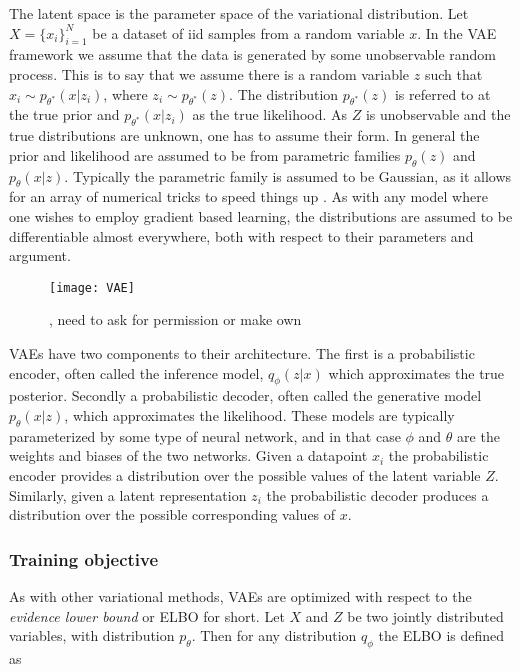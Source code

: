 \documentclass[../../thesis.tex]{subfiles}
\begin{document}
The latent space is the parameter space of the variational distribution.\newline
Let $X = \{x_i\}_{i=1}^{N}$ be a dataset of iid samples from a random variable $x$. In the VAE framework we assume that the data is generated by some unobservable random process. This is to say that we assume there is a random variable $z$ such that $x_i \sim p_{\theta^*}(x|z_i)$, where $z_i \sim p_{\theta^*}(z)$. The distribution $p_{\theta^*}(z)$ is referred to at the true prior and $p_{\theta^*}(x|z_i)$ as the true likelihood. 
As $Z$ is unobservable and the true distributions are unknown, one has to assume their form. In general the prior and likelihood are assumed to be from parametric families $p_{\theta}(z)$ and $p_{\theta}(x|z)$. Typically the parametric family is assumed to be Gaussian, as it allows for an array of numerical tricks to speed things up . As with any model where one wishes to employ gradient based learning, the distributions are assumed to be differentiable almost everywhere, both with respect to their parameters and argument.\newline
\begin{figure}[h]
    \texttt{[image: VAE]}
    \centering  
    \caption{\cite{VAE}, need to ask for permission or make own}  
\end{figure}

VAEs have two components to their architecture. The first is a probabilistic encoder, often called the inference model, $q_\phi(z|x)$ which approximates the true posterior. Secondly a probabilistic decoder, often called the generative model $p_\theta(x|z)$, which approximates the likelihood. These models are typically parameterized by some type of neural network, and in that case $\phi$ and $\theta$ are the weights and biases of the two networks. Given a datapoint $x_i$ the probabilistic encoder provides a distribution over the possible values of the latent variable $Z$. Similarly, given a latent representation $z_i$ the probabilistic decoder produces a distribution over the possible corresponding values of $x$.

\subsubsection{Training objective}

As with other variational methods, VAEs are optimized with respect to the \textit{evidence lower bound} or ELBO for short. Let $X$ and $Z$ be two jointly distributed variables, with distribution $p_\theta$. Then for any distribution $q_\phi$ the ELBO is defined as
\end{document}
